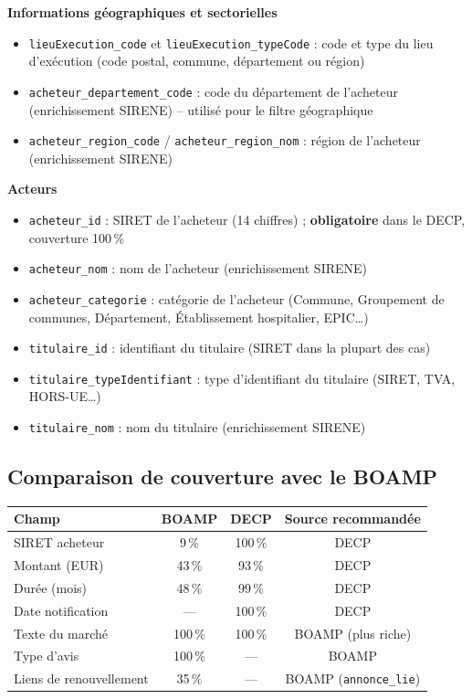 \documentclass[12pt,a4paper]{article}
\begin{document}
\medskip
\textbf{Informations géographiques et sectorielles}

\begin{itemize}
  \item[---] \texttt{lieuExecution\_code} et \texttt{lieuExecution\_typeCode} :
    code et type du lieu d'exécution (code postal, commune, département ou
    région)
  \item[---] \texttt{acheteur\_departement\_code} : code du département de
    l'acheteur (enrichissement SIRENE) -- utilisé pour le filtre géographique
  \item[---] \texttt{acheteur\_region\_code} / \texttt{acheteur\_region\_nom} :
    région de l'acheteur (enrichissement SIRENE)
\end{itemize}

\medskip
\textbf{Acteurs}

\begin{itemize}
  \item[---] \texttt{acheteur\_id} : SIRET de l'acheteur (14 chiffres) ;
    \textbf{obligatoire} dans le DECP, couverture 100\,\%
  \item[---] \texttt{acheteur\_nom} : nom de l'acheteur (enrichissement SIRENE)
  \item[---] \texttt{acheteur\_categorie} : catégorie de l'acheteur (Commune,
    Groupement de communes, Département, Établissement hospitalier, EPIC\ldots)
  \item[---] \texttt{titulaire\_id} : identifiant du titulaire (SIRET dans la
    plupart des cas)
  \item[---] \texttt{titulaire\_typeIdentifiant} : type d'identifiant du
    titulaire (SIRET, TVA, HORS-UE\ldots)
  \item[---] \texttt{titulaire\_nom} : nom du titulaire (enrichissement SIRENE)
\end{itemize}

\subsection{Comparaison de couverture avec le BOAMP}
\label{sec:decp-comparaison}

\begin{center}
\begin{tabular}{lccc}
\toprule
\textbf{Champ} & \textbf{BOAMP} & \textbf{DECP} &
  \textbf{Source recommandée} \\
\midrule
SIRET acheteur    & 9\,\%   & 100\,\% & DECP \\
Montant (EUR)     & 43\,\%  & 93\,\%  & DECP \\
Durée (mois)      & 48\,\%  & 99\,\%  & DECP \\
Date notification & ---     & 100\,\% & DECP \\
Texte du marché   & 100\,\% & 100\,\% & BOAMP (plus riche) \\
Type d'avis       & 100\,\% & ---     & BOAMP \\
Liens de renouvellement & 35\,\% & ---  & BOAMP (\texttt{annonce\_lie}) \\
\bottomrule
\end{tabular}
\end{center}
\end{document}
